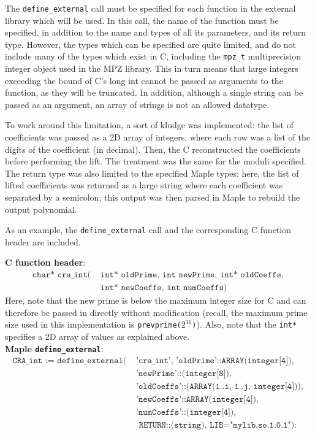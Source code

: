 \documentclass[letterpaper,12pt,titlepage,oneside,final]{book}
\begin{document}
\begin{appendices}
The \texttt{define\_external} call must be specified for each function in the external library which will be used.  In this call, the name of the function must be specified, in addition to the name and types of all its parameters, and its return type.  However, the types which can be specified are quite limited, and do not include many of the types which exist in C, including the \texttt{mpz\_t} multiprecision integer object used in the MPZ library.  This in turn means that large integers exceeding the bound of C's long int cannot be passed as arguments to the function, as they will be truncated.  In addition, although a single string can be passed as an argument, an array of strings is not an allowed datatype.  

To work around this limitation, a sort of kludge was implemented: the list of coefficients was passed as a 2D array of integers, where each row was a list of the digits of the coefficient (in decimal).  Then, the C reconstructed the coefficients before performing the lift.  The treatment was the same for the moduli specified.  The return type was also limited to the specified Maple types: here, the list of lifted coefficients was returned as a large string where each coefficient was separated by a semicolon; this output was then parsed in Maple to rebuild the output polynomial.

As an example, the \texttt{define\_external} call and the corresponding C function header are included.

\noindent \textbf{C function header}: 
\begin{align*} 
  \texttt{char* cra\_int( }& \texttt{int* oldPrime, int newPrime, int* oldCoeffs, } \\ 
                           &\texttt{int* newCoeffs, int numCoeffs)}
\end{align*}
Here, note that the new prime is below the maximum integer size for C and can therefore be passed in directly without modification (recall, the maximum prime size used in this implementation is \texttt{prevprime($2^{31}$)}).  Also, note that the \texttt{int*} specifies a 2D array of values as explained above.\\

\noindent \textbf{Maple \texttt{define\_external}}:
\begin{align*}
  \texttt{CRA\_int := define\_external( }& \texttt{'cra\_int', 'oldPrime'::ARRAY(integer[4]), } \\
                                         &\texttt{'newPrime'::(integer[8]), } \\
                                         &\texttt{'oldCoeffs'::(ARRAY(1..i, 1..j, integer[4])), } \\
                                         &\texttt{'newCoeffs'::ARRAY(integer[4]), } \\
                                         &\texttt{'numCoeffs'::(integer[4]), } \\
                                         &\texttt{ RETURN::(string), LIB="mylib.so.1.0.1"):}  
\end{align*}


\end{appendices}
\end{document}
